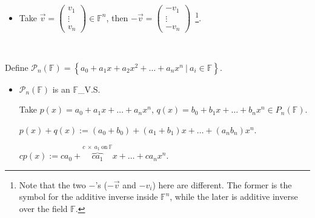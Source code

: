 \documentclass[11pt,fleqn]{book} %
\begin{document}
\begin{example}
\begin{itemize}
        \item Take $\overrightarrow{v} = \begin{pmatrix} v_1 \\ \vdots \\ v_n \end{pmatrix} \in \mathbb{F}^n$, then $-\overrightarrow{v} = \begin{pmatrix} -v_1 \\ \vdots \\ -v_n \end{pmatrix}$~\footnote{Note that the two $-$'s ($-\overrightarrow{v}$ and $-v_i$) here are different. The former is the symbol for the additive inverse inside $\mathbb{F}^n$, while the later is additive inverse over the field $\mathbb{F}$. }. 
    \end{itemize}
\end{example}

\begin{example}
{~~~}

    Define $\mathcal{P}_n(\mathbb{F}) = \left\{ a_0 + a_1x + a_2x^2 + \dots + a_nx^n ~|~a_i \in \mathbb{F} \right\}$. 
    
    \begin{itemize}
        \item $\mathcal{P}_n(\mathbb{F})$ is an $\mathbb{F}$\_V.S. 
        
        Take $p(x) = a_0 + a_1x + \dots + a_nx^n$, $q(x)=b_0 + b_1x + \dots + b_nx^n \in P_n(\mathbb{F})$. 
        
        $p(x)+q(x):=(a_0+b_0)+(a_1+b_1)x+\dots+(a_nb_n)x^n$. 
        
        $cp(x) := ca_0 + \overbrace{ca_1}^{c ~\times~ a_1 \mathrm{~on~}\mathbb{F}}x + \dots + ca_nx^n$. 
    \end{itemize}
\end{example}
\end{document}
